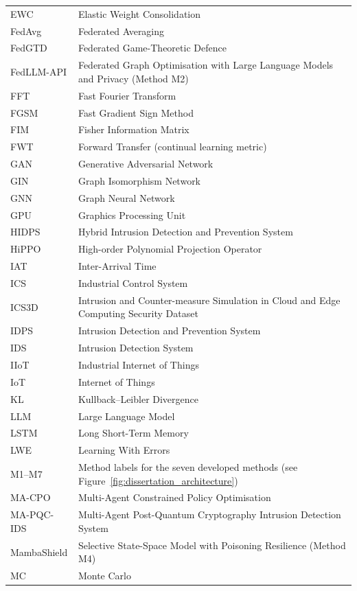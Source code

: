 \begin{longtable}{@{}p{3.8cm} p{10cm}@{}}
EWC & Elastic Weight Consolidation \\
FedAvg & Federated Averaging \\
FedGTD & Federated Game-Theoretic Defence \\
FedLLM-API & Federated Graph Optimisation with Large Language Models and Privacy (Method M2) \\
FFT & Fast Fourier Transform \\
FGSM & Fast Gradient Sign Method \\
FIM & Fisher Information Matrix \\
FWT & Forward Transfer (continual learning metric) \\
GAN & Generative Adversarial Network \\
GIN & Graph Isomorphism Network \\
GNN & Graph Neural Network \\
GPU & Graphics Processing Unit \\
HIDPS & Hybrid Intrusion Detection and Prevention System \\
HiPPO & High-order Polynomial Projection Operator \\
IAT & Inter-Arrival Time \\
ICS & Industrial Control System \\
ICS3D & Intrusion and Counter-measure Simulation in Cloud and Edge Computing Security Dataset \\
IDPS & Intrusion Detection and Prevention System \\
IDS & Intrusion Detection System \\
IIoT & Industrial Internet of Things \\
IoT & Internet of Things \\
KL & Kullback--Leibler Divergence \\
LLM & Large Language Model \\
LSTM & Long Short-Term Memory \\
LWE & Learning With Errors \\
M1--M7 & Method labels for the seven developed methods (see Figure~\ref{fig:dissertation_architecture}) \\
MA-CPO & Multi-Agent Constrained Policy Optimisation \\
MA-PQC-IDS & Multi-Agent Post-Quantum Cryptography Intrusion Detection System \\
MambaShield & Selective State-Space Model with Poisoning Resilience (Method M4) \\
MC & Monte Carlo \\

\end{longtable}
